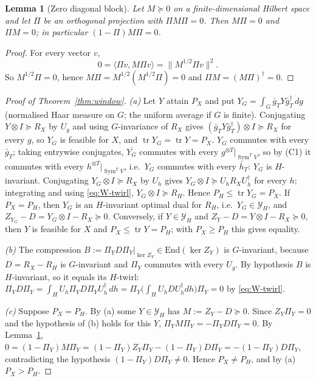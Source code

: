 \documentclass[11pt]{article}
\newcommand{\tr}{\operatorname{tr}}
\newcommand{\Sym}{\operatorname{Sym}}
\newtheorem{lemma}[theorem]{Lemma}
\theoremstyle{definition}
\theoremstyle{remark}
\begin{document}
\begin{lemma}[Zero diagonal block]\label{lem:zeroblock}
Let $M\succeq0$ on a finite-dimensional Hilbert space and let $\Pi$ be an orthogonal projection with $\Pi M\Pi=0$. Then $M\Pi=0$ and $\Pi M=0$; in
particular $(1-\Pi)M\Pi=0$.
\end{lemma}
\begin{proof}
For every vector $v$,
\[0=\langle\Pi v,M\Pi v\rangle=\lVert M^{1/2}\Pi v\rVert^2 .\]
So $M^{1/2}\Pi=0$, hence $M\Pi=M^{1/2}(M^{1/2}\Pi)=0$ and $\Pi M=(M\Pi)^\dagger=0$.
\end{proof}

\begin{proof}[Proof of Theorem~\ref{thm:window}]
\emph{(a)} Let $Y$ attain $P_X$ and put $Y_G=\int_G\bar g_TY\bar g_T^\dagger\,dg$ (normalised Haar measure on $G$; the uniform average if $G$ is
finite). Conjugating $Y\otimes I\succeq R_X$ by $U_g$ and using $G$-invariance of $R_X$ gives $(\bar g_TY\bar g_T^\dagger)\otimes I\succeq R_X$ for every $g$, so
$Y_G$ is feasible for $X$, and $\tr Y_G=\tr Y=P_X$. $Y_G$ commutes with every $\bar g_T$; taking entrywise conjugates, $\overline{Y_G}$ commutes with every
$g^{\otimes T}|_{\Sym^TV}$, so by (C1) it commutes with every $h^{\otimes T}|_{\Sym^TV}$, i.e.\ $Y_G$ commutes with every $\bar h_T$: $Y_G$ is
$H$-invariant. Conjugating $Y_G\otimes I\succeq R_X$ by $U_h$ gives $Y_G\otimes I\succeq U_hR_XU_h^\dagger$ for every $h$; integrating and using
\eqref{eq:W-twirl}, $Y_G\otimes I\succeq R_H$. Hence $P_H\le\tr Y_G=P_X$. If $P_X=P_H$, then $Y_G$ is an $H$-invariant optimal dual for $R_H$, i.e.\
$Y_G\in\mathcal Y_H$, and $Z_{Y_G}-D=Y_G\otimes I-R_X\succeq0$. Conversely, if $Y\in\mathcal Y_H$ and $Z_Y-D=Y\otimes I-R_X\succeq0$, then $Y$ is
feasible for $X$ and $P_X\le\tr Y=P_H$; with $P_X\ge P_H$ this gives equality.

\emph{(b)} The compression $B:=\Pi_YD\Pi_Y|_{\ker Z_Y}\in\mathrm{End}(\ker Z_Y)$ is $G$-invariant, because $D=R_X-R_H$ is $G$-invariant and $\Pi_Y$
commutes with every $U_g$. By hypothesis $B$ is $H$-invariant, so it equals its $H$-twirl:
$\Pi_YD\Pi_Y=\int_HU_h\Pi_YD\Pi_YU_h^\dagger\,dh=\Pi_Y\big(\int_HU_hDU_h^\dagger dh\big)\Pi_Y=0$ by \eqref{eq:W-twirl}.

\emph{(c)} Suppose $P_X=P_H$. By (a) some $Y\in\mathcal Y_H$ has $M:=Z_Y-D\succeq0$. Since $Z_Y\Pi_Y=0$ and the hypothesis of (b) holds for this $Y$,
$\Pi_YM\Pi_Y=-\Pi_YD\Pi_Y=0$. By Lemma~\ref{lem:zeroblock}, $0=(1-\Pi_Y)M\Pi_Y=(1-\Pi_Y)Z_Y\Pi_Y-(1-\Pi_Y)D\Pi_Y=-(1-\Pi_Y)D\Pi_Y$,
contradicting the hypothesis $(1-\Pi_Y)D\Pi_Y\ne0$. Hence $P_X\ne P_H$, and by (a) $P_X>P_H$.


\end{proof}
\end{document}

